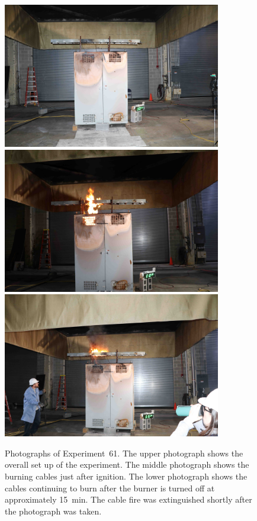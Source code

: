 \begin{figure}[p]
\centering
\includegraphics[height=2.50in]{../FIGURES/Test_61_setup} \\ \vspace{0.1in}
\includegraphics[height=2.50in]{../FIGURES/Test_61_10_min_28_s} \\ \vspace{0.1in}
\includegraphics[height=2.50in]{../FIGURES/Test_61_15_min_34_s}
\caption[Photographs of Experiment~61]{Photographs of Experiment~61. The upper photograph shows the overall set up of the experiment. The middle photograph shows the burning cables just after ignition. The lower photograph shows the cables continuing to burn after the burner is turned off at approximately 15~min. The cable fire was extinguished shortly after the photograph was taken. }
\label{fig:Test_61_photos}
\end{figure}


